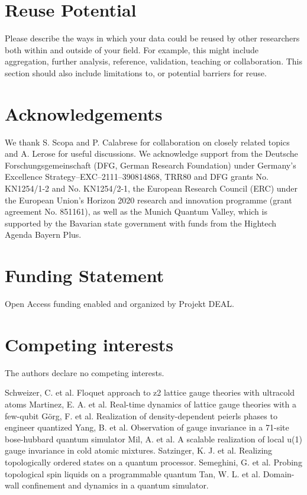 \documentclass{article}
\begin{document}
\section{Reuse Potential}
Please describe the ways in which your data could be reused by other researchers both within and outside of your field. For example, this might include aggregation, further analysis, reference, validation, teaching or collaboration. This section should also include limitations to, or potential barriers for reuse.

\section*{Acknowledgements}
We thank S. Scopa and P. Calabrese for collaboration on closely related topics and A. Lerose for useful discussions. We acknowledge support from the Deutsche Forschungsgemeinschaft (DFG, German Research Foundation) under Germany’s Excellence Strategy–EXC–2111–390814868, TRR80 and DFG grants No. KN1254/1-2 and No. KN1254/2-1, the European Research Council (ERC) under the European Union’s Horizon 2020 research and innovation programme (grant agreement No. 851161), as well as the Munich Quantum Valley, which is supported by the Bavarian state government with funds from the Hightech Agenda Bayern Plus.
\section*{Funding Statement}
Open Access funding enabled and organized by Projekt DEAL.

\section*{Competing interests} 
The authors declare no competing interests.


\begin{thebibliography}{8}
	 Schweizer, C. et al. Floquet approach to z2 lattice gauge theories with ultracold atoms
	 Martinez, E. A. et al. Real-time dynamics of lattice gauge theories with a few-qubit
	 Görg, F. et al. Realization of density-dependent peierls phases to engineer quantized
	 Yang, B. et al. Observation of gauge invariance in a 71-site bose-hubbard quantum simulator
	 Mil, A. et al. A scalable realization of local u(1) gauge invariance in cold atomic mixtures.
	 Satzinger, K. J. et al. Realizing topologically ordered states on a quantum processor.
	 Semeghini, G. et al. Probing topological spin liquids on a programmable quantum
	 Tan, W. L. et al. Domain-wall confinement and dynamics in a quantum simulator.

\end{thebibliography} 
\end{document}
